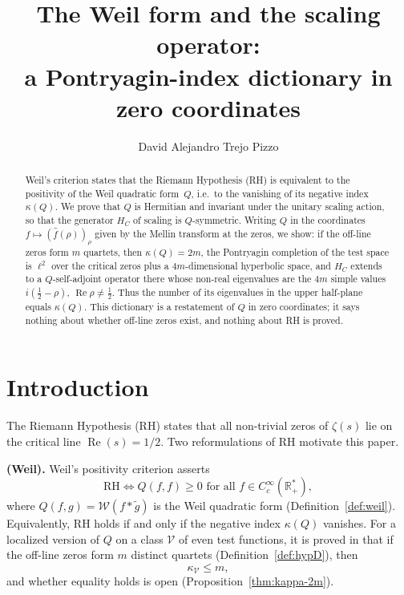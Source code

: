 \documentclass[11pt]{amsart}
\title[The Weil form and the scaling operator]{The Weil form and the scaling operator:\\
  a Pontryagin-index dictionary in zero coordinates}
\author{David Alejandro Trejo Pizzo}
\renewcommand{\Re}{\operatorname{Re}}
\newcommand{\kap}{\kappa}
\newcommand{\Wcal}{\mathcal{W}}
\newcommand{\Rp}{\mathbb{R}^*_+}
\begin{document}
\begin{abstract}
Weil's criterion states that the Riemann Hypothesis (RH) is equivalent to the positivity of
the Weil quadratic form~$Q$, i.e.\ to the vanishing of its negative index $\kap(Q)$.
We prove that $Q$ is Hermitian and invariant under the unitary scaling action, so that the
generator $H_C$ of scaling is $Q$-symmetric. Writing $Q$ in the coordinates
$f\mapsto(\hat f(\rho))_\rho$ given by the Mellin transform at the zeros, we show: if the
off-line zeros form $m$ quartets, then $\kap(Q)=2m$, the Pontryagin completion of the test space
is $\ell^2$ over the critical zeros plus a $4m$-dimensional hyperbolic space, and $H_C$ extends
to a $Q$-self-adjoint operator there whose non-real eigenvalues are the $4m$ simple values
$i(\tfrac12-\rho)$, $\Re\rho\ne\tfrac12$. Thus the number of its eigenvalues in the upper
half-plane equals $\kap(Q)$. This dictionary is a restatement of $Q$ in zero coordinates; it
says nothing about whether off-line zeros exist, and nothing about RH is proved.
\end{abstract}

\maketitle

\tableofcontents
\newpage

\section{Introduction}

The Riemann Hypothesis (RH) states that all non-trivial zeros of $\zeta(s)$ lie on the
critical line $\Re(s) = 1/2$.  Two reformulations of RH motivate this paper.

\medskip
\textbf{(Weil).}  Weil's positivity criterion \cite{Weil52} asserts
\[
  \mathrm{RH} \iff Q(f,f) \ge 0 \text{ for all } f\in C_c^\infty(\Rp),
\]
where $Q(f,g) = \Wcal(f*\tilde g)$ is the Weil quadratic form (Definition~\ref{def:weil}).
Equivalently, RH holds if and only if the negative index $\kap(Q)$ vanishes. For a localized
version of $Q$ on a class $\mathcal V$ of even test functions, it is proved in \cite{Index}
that if the off-line zeros form $m$ distinct quartets
(Definition~\ref{def:hypD}), then
\begin{equation}\label{eq:kappa-2m}
  \kap_{\mathcal V} \le m,
\end{equation}
and whether equality holds is open (Proposition~\ref{thm:kappa-2m}).
\end{document}
